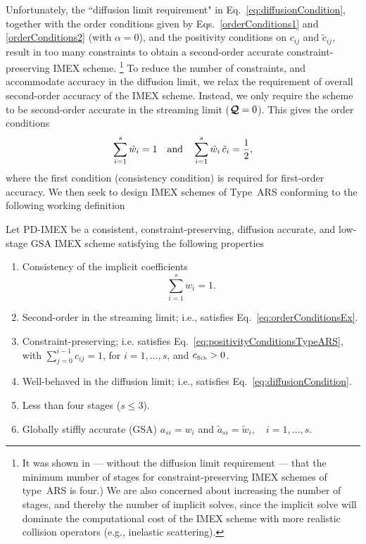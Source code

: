 Unfortunately, the ``diffusion limit requirement" in Eq.~\eqref{eq:diffusionCondition}, together with the order conditions given by Eqs.~\eqref{orderConditions1} and \eqref{orderConditions2} (with $\alpha=0$), and the positivity conditions on $c_{ij}$ and $\tilde{c}_{ij}$, result in too many constraints to obtain a second-order accurate constraint-preserving IMEX scheme.
\footnote{It was shown in \cite{hu_etal_2018} --- without the diffusion limit requirement --- that the minimum number of stages for constraint-preserving IMEX schemes of type~ARS is four.)  
We are also concerned about increasing the number of stages, and thereby the number of implicit solves, since the implicit solve will dominate the computational cost of the IMEX scheme with more realistic collision operators (e.g., inelastic scattering).}  
To reduce the number of constraints, and accommodate accuracy in the diffusion limit, we relax the requirement of overall second-order accuracy of the IMEX scheme.  
Instead, we only require the scheme to be second-order accurate in the streaming limit ($\boldsymbol{\mathcal{Q}}=0$).  
This gives the order conditions
\begin{equation}
  \sum_{i=1}^{s}\tilde{w}_{i}=1
  \quad\text{and}\quad
  \sum_{i=1}^{s}\tilde{w}_{i}\,\tilde{c}_{i}=\frac{1}{2},
  \label{eq:orderConditionsEx}
\end{equation}
where the first condition (consistency condition) is required for first-order accuracy.  
We then seek to design IMEX schemes of Type~ARS conforming to the following working definition
\begin{define}
  Let PD-IMEX be a consistent, constraint-preserving, diffusion accurate, and low-stage GSA IMEX scheme satisfying the following properties
  \begin{enumerate}
    \item Consistency of the implicit coefficients
    \begin{equation}
      \sum_{i=1}^{s}w_{i}=1.
      \label{eq:implicitConsistency}
    \end{equation}
    \item Second-order in the streaming limit; i.e., satisfies Eq.~\eqref{eq:orderConditionsEx}.
    \item Constraint-preserving; i.e. satisfies Eq.~\eqref{eq:positivityConditionsTypeARS}, with $\sum_{j=0}^{i-1}c_{ij}=1$, for $i=1,\ldots,s$, and $c_{\mbox{\tiny Sch}}>0$.
    \item Well-behaved in the diffusion limit; i.e., satisfies Eq.~\eqref{eq:diffusionCondition}.
    \item Less than four stages ($s\le3$).
    \item Globally stiffly accurate (GSA) $a_{si}=w_{i}$ and $\tilde{a}_{si}=\tilde{w}_{i},\quad i=1,\ldots,s$.
  \end{enumerate}
  \label{def:PD-IMEX}
\end{define}
